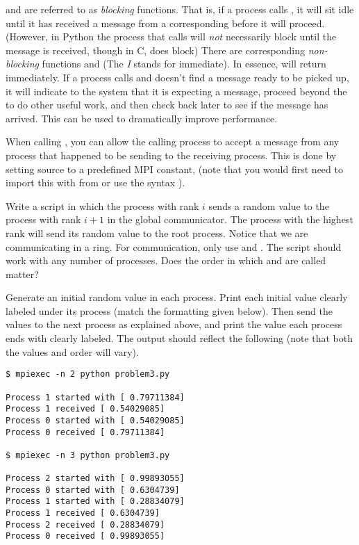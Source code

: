 \begin{info}
 and  are referred to as \emph{blocking} functions.
That is, if a process calls , it will sit idle until it has received a message from a corresponding  before it will proceed.
(However, in Python the process that calls  will \emph{not} necessarily block until the message is received, though in C,  does block)
There are corresponding \emph{non-blocking} functions  and  (The \emph{I} stands for immediate).
In essence,  will return immediately.
If a process calls  and doesn't find a message ready to be picked up, it will indicate to the system that it is expecting a message, proceed beyond the  to do other useful work, and then check back later to see if the message has arrived.
This can be used to dramatically improve performance.
\end{info}

\begin{info}
    When calling , you can allow the calling process to accept a message from any process that happened to be sending to the receiving process.
    This is done by setting source to a predefined MPI constant,  (note that you would first need to import this with from  or use the syntax ).
\end{info}

\begin{problem}
Write a script in which the process with rank $i$ sends a random value to the process with rank $i+1$ in the global communicator.
The process with the highest rank will send its random value to the root process.
Notice that we are communicating in a ring.
For communication, only use  and .
The script should work with any number of processes.
Does the order in which  and  are called matter?

Generate an initial random value in each process.
    Print each initial value clearly labeled under its process (match the formatting given below).
Then send the values to the next process as explained above, and print the value each process ends with clearly labeled.
The output should reflect the following (note that both the values and order will vary).
\begin{lstlisting}[style=ShellOutput]
$ mpiexec -n 2 python problem3.py

Process 1 started with [ 0.79711384]
Process 1 received [ 0.54029085]
Process 0 started with [ 0.54029085]
Process 0 received [ 0.79711384]

$ mpiexec -n 3 python problem3.py

Process 2 started with [ 0.99893055]
Process 0 started with [ 0.6304739]
Process 1 started with [ 0.28834079]
Process 1 received [ 0.6304739]
Process 2 received [ 0.28834079]
Process 0 received [ 0.99893055]
\end{lstlisting}
\end{problem}

